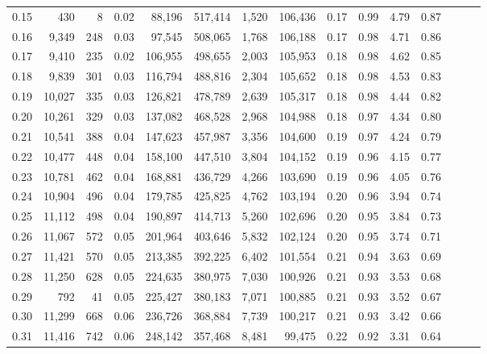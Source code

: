 \begin{tabular}{rrrrrrrrrrrrrrr}
0.15 &     430 &      8 &  0.02 &   88,196 &  517,414 &    1,520 &  106,436 &  0.17 &  0.99 &  4.79 &      0.87 \\
0.16 &   9,349 &    248 &  0.03 &   97,545 &  508,065 &    1,768 &  106,188 &  0.17 &  0.98 &  4.71 &      0.86 \\
0.17 &   9,410 &    235 &  0.02 &  106,955 &  498,655 &    2,003 &  105,953 &  0.18 &  0.98 &  4.62 &      0.85 \\
0.18 &   9,839 &    301 &  0.03 &  116,794 &  488,816 &    2,304 &  105,652 &  0.18 &  0.98 &  4.53 &      0.83 \\
0.19 &  10,027 &    335 &  0.03 &  126,821 &  478,789 &    2,639 &  105,317 &  0.18 &  0.98 &  4.44 &      0.82 \\
0.20 &  10,261 &    329 &  0.03 &  137,082 &  468,528 &    2,968 &  104,988 &  0.18 &  0.97 &  4.34 &      0.80 \\
0.21 &  10,541 &    388 &  0.04 &  147,623 &  457,987 &    3,356 &  104,600 &  0.19 &  0.97 &  4.24 &      0.79 \\
0.22 &  10,477 &    448 &  0.04 &  158,100 &  447,510 &    3,804 &  104,152 &  0.19 &  0.96 &  4.15 &      0.77 \\
0.23 &  10,781 &    462 &  0.04 &  168,881 &  436,729 &    4,266 &  103,690 &  0.19 &  0.96 &  4.05 &      0.76 \\
0.24 &  10,904 &    496 &  0.04 &  179,785 &  425,825 &    4,762 &  103,194 &  0.20 &  0.96 &  3.94 &      0.74 \\
0.25 &  11,112 &    498 &  0.04 &  190,897 &  414,713 &    5,260 &  102,696 &  0.20 &  0.95 &  3.84 &      0.73 \\
0.26 &  11,067 &    572 &  0.05 &  201,964 &  403,646 &    5,832 &  102,124 &  0.20 &  0.95 &  3.74 &      0.71 \\
0.27 &  11,421 &    570 &  0.05 &  213,385 &  392,225 &    6,402 &  101,554 &  0.21 &  0.94 &  3.63 &      0.69 \\
0.28 &  11,250 &    628 &  0.05 &  224,635 &  380,975 &    7,030 &  100,926 &  0.21 &  0.93 &  3.53 &      0.68 \\
0.29 &     792 &     41 &  0.05 &  225,427 &  380,183 &    7,071 &  100,885 &  0.21 &  0.93 &  3.52 &      0.67 \\
0.30 &  11,299 &    668 &  0.06 &  236,726 &  368,884 &    7,739 &  100,217 &  0.21 &  0.93 &  3.42 &      0.66 \\
0.31 &  11,416 &    742 &  0.06 &  248,142 &  357,468 &    8,481 &   99,475 &  0.22 &  0.92 &  3.31 &      0.64 \\

\end{tabular}
